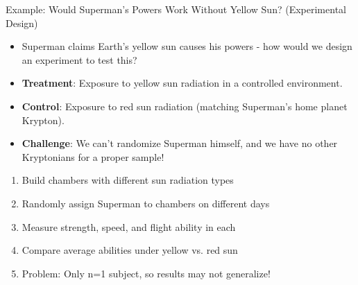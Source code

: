 \documentclass{beamer}
\begin{document}
	\begin{frame}{Example: Would Superman's Powers Work Without Yellow Sun? (Experimental Design)}
		\begin{itemize}
			\item Superman claims Earth's yellow sun causes his powers - how would we design an experiment to test this?
			\item \textbf{Treatment}: Exposure to yellow sun radiation in a controlled environment.
			\item \textbf{Control}: Exposure to red sun radiation (matching Superman's home planet Krypton).
			\item \textbf{Challenge}: We can't randomize Superman himself, and we have no other Kryptonians for a proper sample!
		\end{itemize}
		
		\begin{example}
			\scriptsize
			\begin{enumerate}
				\item Build chambers with different sun radiation types
				\item Randomly assign Superman to chambers on different days
				\item Measure strength, speed, and flight ability in each
				\item Compare average abilities under yellow vs. red sun
				\item Problem: Only n=1 subject, so results may not generalize!
			\end{enumerate}
		\end{example}
	\end{frame}
	
\end{document}
